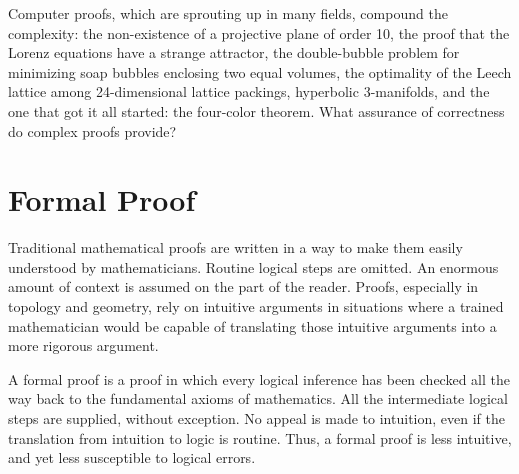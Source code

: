 \documentclass{llncs}
\begin{document}
Computer proofs, which are sprouting up in many fields,
compound the complexity: %
the non-existence of a projective plane of order 10,
the proof that the Lorenz equations have a strange attractor,
the double-bubble problem for minimizing soap bubbles enclosing
two equal volumes, the optimality of the Leech lattice among
24-dimensional lattice packings, hyperbolic $3$-manifolds,
and the one that got it all started: the four-color theorem.
What assurance of correctness do complex proofs provide?



\section{Formal Proof}

Traditional mathematical proofs are written in a way to make them easily understood by mathematicians. Routine logical steps are omitted. An enormous amount of context is assumed on the part of the reader. Proofs, especially in topology and geometry, rely on intuitive arguments in situations where a trained mathematician would be capable of translating those intuitive arguments into a more rigorous argument.


A formal proof is a proof in which every logical inference has
been checked all the way back to the fundamental axioms of mathematics.
All the intermediate logical steps are supplied, without exception. No appeal is made to intuition, even if the translation from intuition to logic is routine. Thus, a formal proof is less intuitive, and yet less susceptible to logical errors.
\end{document}
